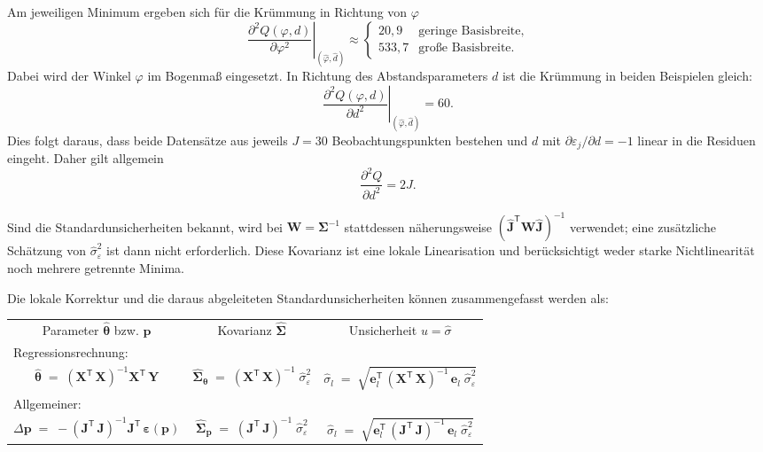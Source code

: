 Am jeweiligen Minimum ergeben sich für die Krümmung in Richtung von
$\varphi$
\[
\left.
\frac{\partial^2 Q(\varphi,d)}
     {\partial \varphi^2}
\right|_{(\hat{\varphi},\hat d)}
\approx
\begin{cases}
20{,}9 & \text{geringe Basisbreite},\\
533{,}7 & \text{große Basisbreite}.
\end{cases}
\]
Dabei wird der Winkel $\varphi$ im Bogenmaß eingesetzt. In Richtung des
Abstandsparameters $d$ ist die Krümmung in beiden Beispielen gleich:
\[
\left.
\frac{\partial^2 Q(\varphi,d)}
     {\partial d^2}
\right|_{(\hat{\varphi},\hat d)}
=60.
\]
Dies folgt daraus, dass beide Datensätze aus jeweils $J=30$ Beobachtungspunkten
bestehen und $d$ mit
$\partial\varepsilon_j/\partial d=-1$ linear in die Residuen eingeht. Daher
gilt allgemein
\[
\frac{\partial^2 Q}{\partial d^2}=2J.
\]

Sind die
Standardunsicherheiten bekannt, wird bei
$\mathbf W=\boldsymbol\Sigma^{-1}$ stattdessen näherungsweise
$(\hat{\boldsymbol J}^{\mathsf T}\mathbf W\hat{\boldsymbol J})^{-1}$
verwendet; eine zusätzliche Schätzung von $\hat\sigma_\varepsilon^2$ ist dann
nicht erforderlich. Diese Kovarianz ist eine lokale Linearisation und berücksichtigt
weder starke Nichtlinearität noch mehrere getrennte Minima.

Die lokale Korrektur und die daraus abgeleiteten Standardunsicherheiten können
zusammengefasst werden als:
\begin{center}
\setlength{\extrarowheight}{1.2em}
\begin{tabular}{ccc}
Parameter $\boldsymbol{\hat \theta}$ bzw. $\mathbf{p}$ & Kovarianz $\boldsymbol{\hat \Sigma}$ & Unsicherheit $u = \hat \sigma$\\
\multicolumn{3}{l}{Regressionsrechnung:  }\\
$ \boldsymbol{\hat \theta} \; = \;
\left( \mathbf{X}^\mathsf{T}  \, \mathbf{X} \right)^{-1} \mathbf{X}^\mathsf{T} \, \mathbf{Y}$
&
$\boldsymbol{\hat \Sigma}_{\boldsymbol{\theta}} \; = \;
\left( \mathbf{X}^\mathsf{T}  \, \mathbf{X} \right)^{-1} \;
\hat \sigma_{\varepsilon}^2$ &
$\hat \sigma_l \; = \;
\sqrt{\boldsymbol{e}_l^\mathsf{T} \, \left( \mathbf{X}^\mathsf{T}  \, \mathbf{X} \right)^{-1} \, \boldsymbol{e}_l  \; \hat \sigma_{\varepsilon}^2}$
\\
%
\multicolumn{3}{l}{Allgemeiner:}\\
$\Delta \mathbf{p} \; = \;
- \left( \mathbf{J}^\mathsf{T}  \, \mathbf{J} \right)^{-1} \mathbf{J}^\mathsf{T} \, \boldsymbol{\varepsilon}(\mathbf{p})$
&
$\boldsymbol{\hat \Sigma}_{\mathbf{p}} \; = \;
\left( \mathbf{J}^\mathsf{T}  \, \mathbf{J} \right)^{-1} \;
\hat \sigma_{\varepsilon}^2$ &
$\hat \sigma_l \; = \;
\sqrt{\boldsymbol{e}_l^\mathsf{T} \, \left( \mathbf{J}^\mathsf{T}  \, \mathbf{J} \right)^{-1} \, \boldsymbol{e}_l  \; \hat \sigma_{\varepsilon}^2}$

\end{tabular}
\end{center}


